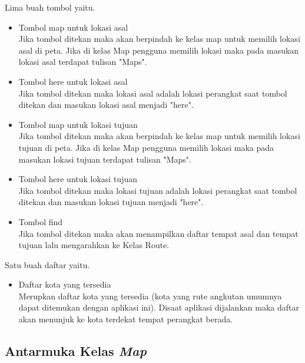 Lima buah tombol yaitu. 
\begin{itemize}
	\item Tombol map untuk lokasi asal\\
	Jika tombol ditekan maka akan berpindah ke kelas map untuk memilih lokasi asal di peta. Jika di kelas Map pengguna memilih lokasi maka pada masukan lokasi asal terdapat tulisan "Maps".
	\item Tombol here untuk lokasi asal\\
	Jika tombol ditekan maka lokasi asal adalah lokasi perangkat saat tombol ditekan dan masukan lokasi asal menjadi "here".
	\item Tombol map untuk lokasi tujuan\\
	Jika tombol ditekan maka akan berpindah ke kelas map untuk memilih lokasi tujuan di peta. Jika di kelas Map pengguna memilih lokasi maka pada masukan lokasi tujuan terdapat tulisan "Maps".
	\item Tombol here untuk lokasi tujuan\\
	Jika tombol ditekan maka lokasi tujuan adalah lokasi perangkat saat tombol ditekan dan masukan lokasi tujuan menjadi "here".
	\item Tombol find\\
	Jika tombol ditekan maka akan menampilkan daftar tempat asal dan tempat tujuan lalu mengarahkan ke Kelas Route.
\end{itemize}

Satu buah daftar yaitu.
\begin{itemize}
	\item Daftar kota yang tersedia\\
	Merupkan daftar kota yang tersedia (kota yang rute angkutan umumnya dapat ditemukan dengan aplikasi ini). Disaat aplikasi dijalankan maka daftar akan menunjuk ke kota terdekat tempat perangkat berada.
\end{itemize}

\subsection{Antarmuka Kelas \textit{Map}}
\label{lab:Antarmuka Kelas Map}

